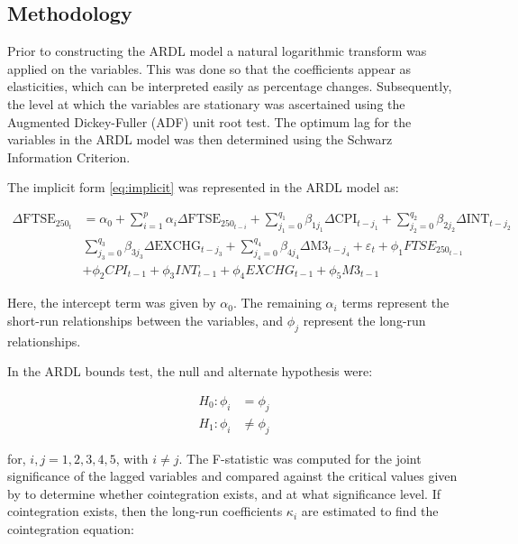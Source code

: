 \documentclass[11pt,a4paper]{article}
\newcommand{\citeboth}[1]{\citeauthor{#1} \citep{#1}}
\begin{document}
\subsection{Methodology}

Prior to constructing the ARDL model a natural logarithmic transform was applied
on the variables. This was done so that the coefficients appear as elasticities, 
which can be interpreted easily as percentage changes. Subsequently,
the level at which the variables are stationary was ascertained using the 
Augmented Dickey-Fuller (ADF) unit root test. The optimum lag for the variables in the ARDL model was then determined using the Schwarz
Information Criterion.

The implicit form \eqref{eq:implicit} was represented in the ARDL model as:

\begin{align*}
    \Delta \text{FTSE}_{250_t} &= \alpha_0 + \sum_{i=1}^{p} \alpha_i \Delta \text{FTSE}_{250_{t-i}} + \sum_{j_{1}=0}^{q_1} \beta_{1j_{1}} \Delta \text{CPI}_{t-j_{1}} + \sum_{j_{2}=0}^{q_2} \beta_{2j_{2}} \Delta \text{INT}_{t-j_{2}} \\
                               & \sum_{j_{3}=0}^{q_3} \beta_{3j_{3}} \Delta \text{EXCHG}_{t-j_{3}} + \sum_{j_{4}=0}^{q_4} \beta_{4j_{4}} \Delta \text{M3}_{t-j_{4}} + \varepsilon_t + \phi_{1} FTSE_{250_{t-1}} \\
                               & + \phi_{2} CPI_{t-1} + \phi_{3} INT_{t-1} +\phi_4 EXCHG_{t-1} + \phi_5 M3_{t-1}
\end{align*}

Here, the intercept term was given by $\alpha_0$. The 
remaining $\alpha_i$ terms represent the short-run relationships 
between the variables, and $\phi_j$ represent the long-run relationships. 

In the ARDL bounds test, the null and alternate hypothesis were:
 
\begin{align*}
    H_{0}: \phi_i &= \phi_j\\
    H_{1}: \phi_i &\neq \phi_j
\end{align*}

for, $i,j = 1,2,3,4,5$, with $i\neq j$. The F-statistic was computed for the joint
significance of the lagged variables and compared against the critical values
given by \citeboth{pesaran2001} to determine whether cointegration exists, 
and at what significance level. If cointegration exists, then 
the long-run coefficients $\kappa_i$ are estimated to find the cointegration equation:
\end{document}

